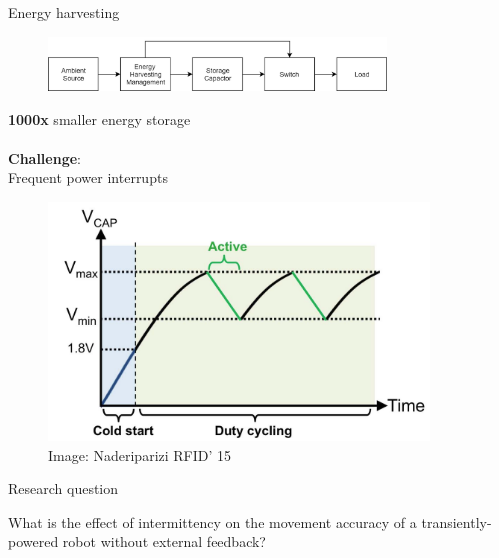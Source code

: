 \documentclass{beamer}
\begin{document}
\begin{frame}{Energy harvesting}
	\begin{figure}
		\centering
		\includegraphics[width=0.8\textwidth]{pics/Harvesting-diagram.png}
	\end{figure}
	\begin{minipage}{0.45\textwidth}
		\textbf{1000x} smaller energy storage \\\\
		\textbf{Challenge}: \\
		Frequent power interrupts
	\end{minipage}
	\begin{minipage}{0.54\textwidth}\raggedleft
		\begin{figure}
			\vspace{2em}
			\includegraphics[width=0.9\textwidth]{pics/Voltage_time_harvester.png}
			\caption*{Image: Naderiparizi RFID' 15}
		\end{figure}
	\end{minipage}
\end{frame}

\begin{frame}{Research question}
	\begin{center}
		What is the effect of intermittency on the movement accuracy of a transiently-powered robot without external feedback?
	\end{center}
\end{frame}
\end{document}
